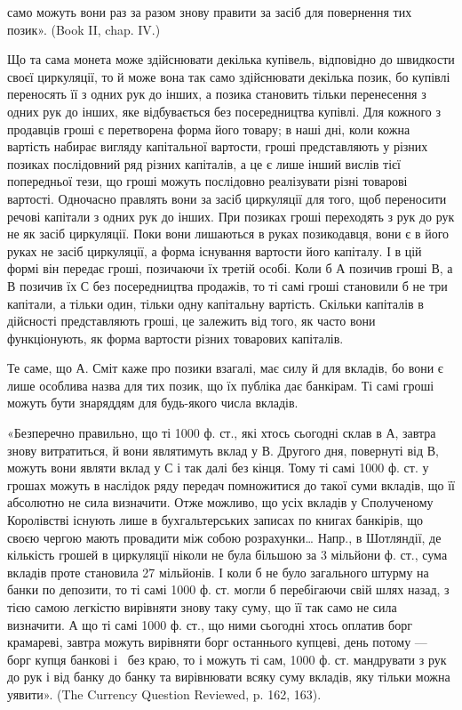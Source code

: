 \parcont{}  %
само можуть вони раз за разом знову правити за засіб для повернення тих
позик». (Book II, chap. IV.)

Що та сама монета може здійснювати декілька купівель, відповідно до швидкости
своєї циркуляції, то й може вона так само здійснювати декілька позик, бо купівлі
переносять її з одних рук до інших, а позика становить тільки перенесення з одних
рук до інших, яке відбувається без посередництва купівлі. Для кожного з продавців
гроші є перетворена форма його товару; в наші дні, коли кожна вартість набирає
вигляду капітальної вартости, гроші представляють у різних позиках послідовний
ряд різних капіталів, а це є лише інший вислів тієї попередньої тези, що гроші
можуть послідовно реалізувати різні товарові вартості. Одночасно правлять
вони за засіб циркуляції для того, щоб переносити речові капітали з одних рук до
інших. При позиках гроші переходять з рук до рук не як засіб циркуляції. Поки
вони лишаються в руках позикодавця, вони є в його руках не засіб циркуляції, а
форма існування вартости його капіталу. І в цій формі він передає гроші, позичаючи
їх третій особі. Коли б А позичив гроші В, а В позичив їх С без
посередництва продажів, то ті самі гроші становили б не три капітали, а тільки
один, тільки одну капітальну вартість. Скільки капіталів в дійсності представляють
гроші, це залежить від того, як часто вони функціонують, як форма
вартости різних товарових капіталів.

Те саме, що А. Сміт каже про позики взагалі, має силу й для вкладів,
бо вони є лише особлива назва для тих позик, що їх публіка дає банкірам.
Ті самі гроші можуть бути знаряддям для будь-якого числа вкладів.

«Безперечно правильно, що ті 1000 ф. ст., які хтось сьогодні склав в А,
завтра знову витратиться, й вони являтимуть вклад у В. Другого дня, повернуті
від В, можуть вони являти вклад у С і так далі без кінця. Тому ті самі
1000 ф. ст. у грошах можуть в наслідок ряду передач помножитися до такої
суми вкладів, що її абсолютно не сила визначити. Отже можливо, що  усіх
вкладів у Сполученому Королівстві існують лише в бухгальтерських записах
по книгах банкірів, що своєю чергою мають провадити між собою розрахунки\dots{}
Напр., в Шотляндії, де кількість грошей в циркуляції ніколи не була більшою
за 3 мільйони ф. ст., сума вкладів проте становила 27 мільйонів. І коли б не
було загального штурму на банки по депозити, то ті самі 1000 ф. ст. могли б
перебігаючи свій шлях назад, з тією самою легкістю вирівняти знову таку суму,
що її так само не сила визначити. А що ті самі 1000 ф. ст., що ними сьогодні
хтось оплатив борг крамареві, завтра можуть вирівняти борг останнього купцеві,
день потому — борг купця банкові і~ без краю, то і можуть ті сам,
1000 ф. ст. мандрувати з рук до рук і від банку до банку та вирівнювати
всяку суму вкладів, яку тільки можна уявити». (The Currency Question Reviewed,
p. 162, 163).

